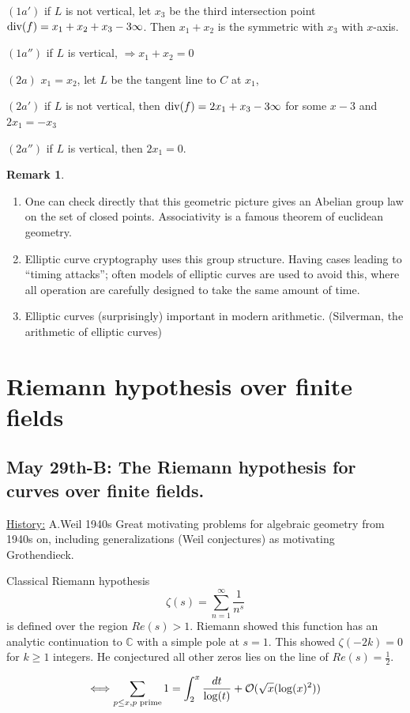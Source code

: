 \documentclass[11pt]{article}
\theoremstyle{definition}
\newtheorem{rmk}[thm]{Remark}
\newcommand{\cplx}{\mathbb C}
\newcommand{\calo}{{\cal O}}
\renewcommand{\div}{\textnormal{div}}
\newcommand{\Lrta}{\Longrightarrow}
\newcommand{\Llrta}{\Longleftrightarrow}
\begin{document}
$(1a')$ if $L$ is not vertical, let $x_3$
 be the third  intersection point $\div(f)=x_1+x_2+x_3-3\infty$. Then $x_1+x_2$ is the symmetric with $x_3$ with $x$-axis.

 $(1a'')$ if $L$ is vertical, $\Lrta x_1+x_2=0$

$(2a)$ $x_1=x_2$, let $L$ be the tangent line to $C$ at $x_1$, 

$(2a')$ if $L$ is not vertical, then $\div(f)=2x_1+x_3-3\infty$ for some $x-3$ and $2x_1=-x_3$

$(2a'')$
 if $L$ is vertical, then $2x_1=0$.

\begin{rmk}\ 
\begin{enumerate}[label=(\arabic*)]
\item One can check directly that this geometric picture gives an Abelian group law on the set of closed points. Associativity is a famous theorem of euclidean geometry.
\item Elliptic curve cryptography uses this group structure. Having cases leading to ``timing attacks''; often models of elliptic curves are used to avoid this, where all operation are carefully designed to take the same amount of time.
\item Elliptic curves (surprisingly) important in modern arithmetic. (Silverman, the arithmetic of elliptic curves)
\end{enumerate}
\end{rmk}
\section{Riemann hypothesis over finite fields}
\subsection{May 29th-B: The Riemann hypothesis for curves over finite fields.}

\underline{History:} A.Weil 1940s Great motivating problems for algebraic geometry from 1940s on, including generalizations
(Weil conjectures) as motivating Grothendieck.

Classical Riemann hypothesis
$$
\zeta(s)=\sum_{n=1}^\infty \frac{1}{n^s}
$$
is defined over the region $Re(s)>1$. Riemann showed this function has an analytic continuation to $\cplx$ with a simple pole at $s=1$. This showed $\zeta(-2k)=0$ for $k\geq 1$ integers. He conjectured all other zeros lies on the line of $Re(s)=\frac{1}{2}$.

$$\Llrta\sum_{p\leq x, p\text{ prime}}1=\int^x_2\frac{dt}{\log(t)}+\calo(\sqrt{x}(\log(x)^2))$$
\end{document}
